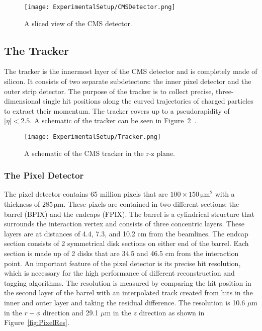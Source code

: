 \begin{figure}[h!]
\texttt{[image: ExperimentalSetup/CMSDetector.png]}
\caption{A sliced view of the CMS detector.}
\label{fig:CMSDetector}
\end{figure}

\subsection{The Tracker}
The tracker is the innermost layer of the CMS detector and is completely made of silicon. It consists of two separate subdetectors: the inner pixel detector and the outer strip detector. The purpose of the tracker is to collect precise, three-dimensional single hit positions along the curved trajectories of charged particles to extract their momentum. The tracker covers up to a pseudorapidity of $\mid\eta\mid < 2.5$. A schematic of the tracker can be seen in Figure~\ref{fig:CMSTracker}~\cite{CMSExperiment}. 

\begin{figure}[h!]
\begin{center}
\texttt{[image: ExperimentalSetup/Tracker.png]}
\end{center}
\caption{A schematic of the CMS tracker in the r-z plane.}
\label{fig:CMSTracker}
\end{figure}

\subsubsection{The Pixel Detector}
The pixel detector contains 65 million pixels that are $100 \times 150\,\mathrm{\mu m}^2$ with a thickness of $285\,\mathrm{\mu m}$. These pixels are contained in two different sections: the barrel (BPIX) and the endcaps (FPIX). The barrel is a cylindrical structure that surrounds the interaction vertex and consists of three concentric layers. These layers are at distances of 4.4, 7.3, and 10.2 cm from the beamlines. The endcap section consists of 2 symmetrical disk sections on either end of the barrel. Each section is made up of 2 disks that are 34.5 and 46.5 cm from the interaction point. An important feature of the pixel detector is its precise hit resolution, which is necessary for the high performance of different reconstruction and tagging algorithms. The resolution is measured by comparing the hit position in the second layer of the barrel with an interpolated track created from hits in the inner and outer layer and taking the residual difference. The resolution is 10.6 $\mu$m in the $r-\phi$ direction and 29.1 $\mu$m in the $z$ direction as shown in Figure~\ref{fig:PixelRes}\cite{PixelResolution}.

